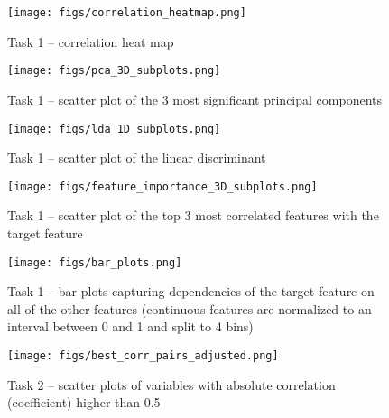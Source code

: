 \documentclass[a4paper,10pt]{article}\setlength{\textheight}{10in}\setlength{\textwidth}{6.5in}\setlength{\topmargin}{-0.125in}\setlength{\oddsidemargin}{-.2in}\setlength{\evensidemargin}{-.2in}\setlength{\headsep}{0.2in}\setlength{\footskip}{0pt}\usepackage{amsmath}\usepackage{fancyhdr}\usepackage{enumitem}\usepackage{hyperref}\usepackage{xcolor}\usepackage{graphicx}\pagestyle{fancy}
\begin{document}
\newpage

\begin{figure}
\begin{adjustwidth}{-0.87cm}{}
    \centering
    \texttt{[image: figs/correlation\_heatmap.png]}
    \caption{Task 1 -- correlation heat map}
    \label{fig:heatmap}
\end{adjustwidth}
\end{figure}

\begin{figure}
\begin{adjustwidth}{-0.87cm}{}
    \centering
    \texttt{[image: figs/pca\_3D\_subplots.png]}
    \caption{Task 1 -- scatter plot of the 3 most significant principal components}
    \label{fig:pca}
\end{adjustwidth}
\end{figure}

\begin{figure}
\begin{adjustwidth}{-0.87cm}{}
    \centering
    \texttt{[image: figs/lda\_1D\_subplots.png]}
    \caption{Task 1 -- scatter plot of the linear discriminant}
    \label{fig:lda}
\end{adjustwidth}
\end{figure}

\begin{figure}
\begin{adjustwidth}{-0.87cm}{}
    \centering
    \texttt{[image: figs/feature\_importance\_3D\_subplots.png]}
    \caption{Task 1 -- scatter plot of the top 3 most correlated features with the target feature}
    \label{fig:top3}
\end{adjustwidth}
\end{figure}

\begin{figure}
\begin{adjustwidth}{-0.87cm}{-0.2 cm}
    \centering
    \texttt{[image: figs/bar\_plots.png]}
    \caption{Task 1 -- bar plots capturing dependencies of the target feature on all of the other features (continuous features are normalized to an interval between 0 and 1 and split to 4 bins)}
    \label{fig:bars}
\end{adjustwidth}
\end{figure}

\begin{figure}
\begin{adjustwidth}{-0.87cm}{}
    \centering
    \texttt{[image: figs/best\_corr\_pairs\_adjusted.png]}
    \caption{Task 2 -- scatter plots of variables with absolute correlation (coefficient) higher than 0.5 }
    \label{fig:best_pairs}
\end{adjustwidth}
\end{figure}
\end{document}
